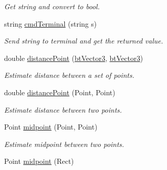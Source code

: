 \begin{DoxyCompactItemize}
\begin{DoxyCompactList}\small\item\em Get string and convert to bool. \end{DoxyCompactList}\item 
string \hyperlink{namespacecommon_a5899229353a9bcf1570191eb9acea137}{cmd\+Terminal} (string s)\hypertarget{namespacecommon_a5899229353a9bcf1570191eb9acea137}{}\label{namespacecommon_a5899229353a9bcf1570191eb9acea137}

\begin{DoxyCompactList}\small\item\em Send string to terminal and get the returned value. \end{DoxyCompactList}\item 
double \hyperlink{namespacecommon_ac8769b01d13707ef6598888005e643e9}{distance\+Point} (\hyperlink{structcommon_1_1btVector3}{bt\+Vector3}, \hyperlink{structcommon_1_1btVector3}{bt\+Vector3})\hypertarget{namespacecommon_ac8769b01d13707ef6598888005e643e9}{}\label{namespacecommon_ac8769b01d13707ef6598888005e643e9}

\begin{DoxyCompactList}\small\item\em Estimate distance between a set of points. \end{DoxyCompactList}\item 
double \hyperlink{namespacecommon_a0319cc29ee430ecb0ca77d0f95cdc309}{distance\+Point} (Point, Point)\hypertarget{namespacecommon_a0319cc29ee430ecb0ca77d0f95cdc309}{}\label{namespacecommon_a0319cc29ee430ecb0ca77d0f95cdc309}

\begin{DoxyCompactList}\small\item\em Estimate distance between two points. \end{DoxyCompactList}\item 
Point \hyperlink{namespacecommon_a2968370f29c08892258794b87bac33fb}{midpoint} (Point, Point)\hypertarget{namespacecommon_a2968370f29c08892258794b87bac33fb}{}\label{namespacecommon_a2968370f29c08892258794b87bac33fb}

\begin{DoxyCompactList}\small\item\em Estimate midpoint between two points. \end{DoxyCompactList}\item 
Point \hyperlink{namespacecommon_a820e29c932b1f0b6a865772239beeb57}{midpoint} (Rect)\hypertarget{namespacecommon_a820e29c932b1f0b6a865772239beeb57}{}\label{namespacecommon_a820e29c932b1f0b6a865772239beeb57}


\end{DoxyCompactItemize}
